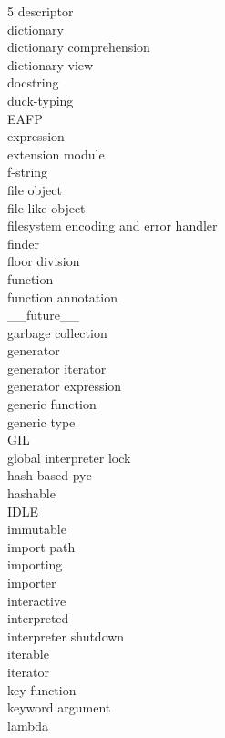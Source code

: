 \documentclass [8pt] {extarticle}
\begin{document}
\begin {multicols} {5}
        descriptor \\
        dictionary \\
        dictionary comprehension \\
        dictionary view \\
        docstring \\
        duck-typing \\
        EAFP \\
        expression \\
        extension module \\
        f-string \\
        file object \\
        file-like object \\
        filesystem encoding and error handler \\
        finder \\
        floor division \\
        function \\
        function annotation \\
        \_\_future\_\_ \\
        garbage collection \\
        generator \\
        generator iterator \\
        generator expression \\
        generic function \\
        generic type \\
        GIL \\
        global interpreter lock \\
        hash-based pyc \\
        hashable \\
        IDLE \\
        immutable \\
        import path \\
        importing \\
        importer \\
        interactive \\
        interpreted \\
        interpreter shutdown \\
        iterable \\
        iterator \\
        key function \\
        keyword argument \\
        lambda \\

\end{multicols}
\end{document}

